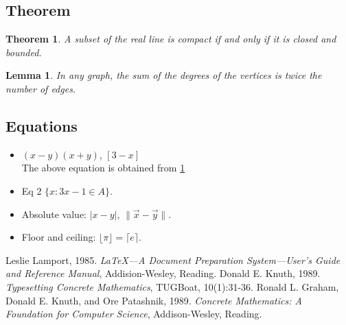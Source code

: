 \documentclass[10pt,a4paper,notitlepage]{article}
\begin{document}
\begin{multicols}{2}
\section{Theorem}
\newtheorem{thm}{Theorem}[section]
\newtheorem{lem}{Lemma}[thm]

\begin{thm}\label{Cref1}
A subset of the real line is compact if and only if it is closed and  bounded. 
\end{thm}
\begin{lem}
In any graph, the sum of the degrees of the vertices is twice the number of edges.
\end{lem}

\subsection{Equations}
\newenvironment{MyItemize}{%
\begin{itemize}%
\setlength{\itemsep}{-2pt}%
\setlength{\parskip}{-2pt}%
\setlength{\parsep}{-2pt}%
}{\end{itemize}}%
\begin{MyItemize}
\item 
  $(x-y)(x+y)$, $[3-x]$\\
  The above equation is obtained from \ref{Cref1}


\item Eq 2
  $\{x : 3x-1 \in A\}$. 


\item Absolute value: $|x-y|$, $\|\vec{x} - \vec{y}\|$. 


\item Floor and ceiling: $\lfloor \pi \rfloor = \lceil e \rceil$. 
\end{MyItemize}

\begin{thebibliography}{9}
Leslie Lamport, 1985. \emph{\LaTeX---A Document
Preparation System---User’s Guide and Reference Manual},
Addision-Wesley, Reading.
Donald E. Knuth, 1989. \emph{Typesetting Concrete
Mathematics}, TUGBoat, 10(1):31-36.
Ronald L. Graham, Donald E. Knuth, and Ore
Patashnik, 1989. \emph{Concrete Mathematics: A Foundation for
Computer Science}, Addison-Wesley, Reading.
\end{thebibliography}
\end{multicols}
\end{document}
